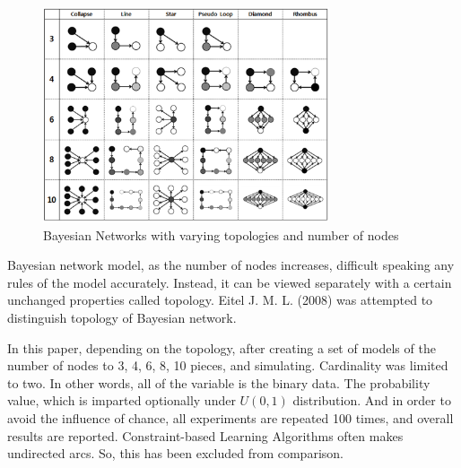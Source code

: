 	\begin{figure}[!h]
	\centering
		\includegraphics[height=180pt]{Topologies}
		\caption{Bayesian Networks with varying topologies and number of nodes}
	\end{figure}

Bayesian network model, as the number of nodes increases, difficult speaking any rules of the model accurately. Instead, it can be viewed separately with a certain unchanged properties called topology.
Eitel J. M. L. (2008) was attempted to distinguish topology of Bayesian network.

In this paper, depending on the topology, after creating a set of models of the number of nodes to 3, 4, 6, 8, 10 pieces, and simulating. Cardinality was limited to two. In other words, all of the variable is the binary data. The probability value, which is imparted optionally under $ U (0,1) $ distribution. And in order to avoid the influence of chance, all experiments are repeated 100 times, and overall results are reported. Constraint-based Learning Algorithms often makes undirected arcs. So, this has been excluded from comparison.